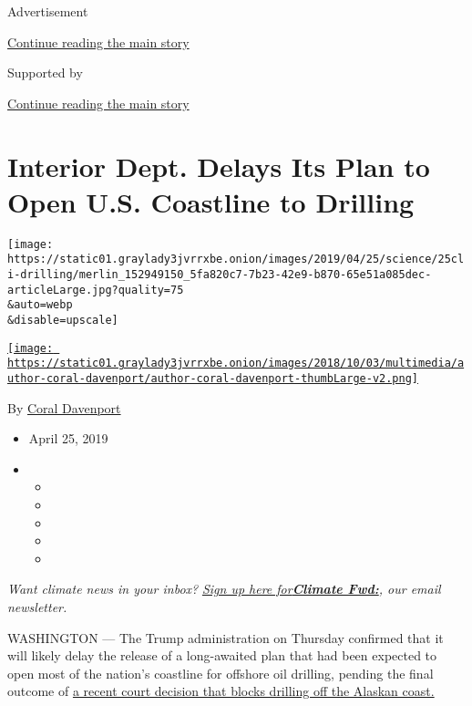Advertisement

\protect\hyperlink{after-top}{Continue reading the main story}

Supported by

\protect\hyperlink{after-sponsor}{Continue reading the main story}

\hypertarget{interior-dept-delays-its-plan-to-open-us-coastline-to-drilling}{%
\section{Interior Dept. Delays Its Plan to Open U.S. Coastline to
Drilling}\label{interior-dept-delays-its-plan-to-open-us-coastline-to-drilling}}

\texttt{[image: https://static01.graylady3jvrrxbe.onion/images/2019/04/25/science/25cli-drilling/merlin\_152949150\_5fa820c7-7b23-42e9-b870-65e51a085dec-articleLarge.jpg?quality=75\\\&auto=webp\\\&disable=upscale]}

\href{https://www.nytimes3xbfgragh.onion/by/coral-davenport}{\texttt{[image: https://static01.graylady3jvrrxbe.onion/images/2018/10/03/multimedia/author-coral-davenport/author-coral-davenport-thumbLarge-v2.png]}}

By \href{https://www.nytimes3xbfgragh.onion/by/coral-davenport}{Coral
Davenport}

\begin{itemize}
\item
  April 25, 2019
\item
  \begin{itemize}
  \item
  \item
  \item
  \item
  \item
  \end{itemize}
\end{itemize}

\emph{Want climate news in your inbox?}
\href{https://www.nytimes3xbfgragh.onion/newsletters/climate-change}{\emph{Sign
up here
for}}\textbf{\href{https://www.nytimes3xbfgragh.onion/newsletters/climate-change}{\emph{Climate
Fwd:}}}\emph{, our email newsletter.}

WASHINGTON --- The Trump administration on Thursday confirmed that it
will likely delay the release of a long-awaited plan that had been
expected to open most of the nation's coastline for offshore oil
drilling, pending the final outcome of
\href{https://www.nytimes3xbfgragh.onion/2019/03/30/climate/trump-oil-drilling-arctic.html}{a
recent court decision that blocks drilling off the Alaskan coast.}

